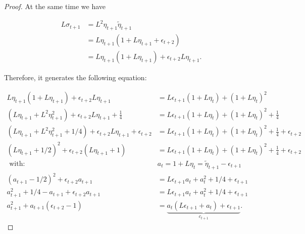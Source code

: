\documentclass[12pt]{article}
\begin{document}
\begin{proof}
            At the same time we have 

            \begin{align*}
                L \sigma_{t + 1} &= L^2 \eta_{t + 1}\tilde \eta_{t + 1} 
                \\
                &= L\eta_{t + 1}(1 + L \eta_{t + 1} + \epsilon_{t + 2})
                \\
                &= L\eta_{t + 1}(1 + L \eta_{t + 1}) + \epsilon_{t + 2}L\eta_{t + 1}. 
            \end{align*}

            Therefore, it generates the following equation: 

            \begin{align*}
                L\eta_{t + 1} (1 + L \eta_{t + 1}) 
                + 
                \epsilon_{t + 2} L \eta_{t + 1} 
                &= 
                L\epsilon_{t + 1}(1 + L \eta_t)  + (1 + L\eta_t)^2
                \\
                (L\eta_{t + 1} + L^2\eta_{t + 1}^2)
                + 
                \epsilon_{t + 2} L \eta_{t + 1} 
                + 
                \frac{1}{4}
                &= 
                L\epsilon_{t + 1}(1 + L \eta_t)  + (1 + L\eta_t)^2
                + 
                \frac{1}{4}
                \\
                (L\eta_{t + 1} + L^2\eta_{t + 1}^2 + 1/4)
                + 
                \epsilon_{t + 2} L \eta_{t + 1} 
                + \epsilon_{t + 2}
                &= 
                L\epsilon_{t + 1}(1 + L \eta_t)  + (1 + L\eta_t)^2
                + \frac{1}{4}
                + \epsilon_{t + 2}
                \\
                (L\eta_{t + 1} + 1/2)^2 + \epsilon_{t + 2}(L \eta_{t + 1} + 1)
                &= 
                L \epsilon_{t + 1}(1 + L \eta_t) + (1 + L\eta_t)^2
                + \frac{1}{4} + \epsilon_{t + 2}
                \\
                \text{ with: } & a_t = 1 + L \eta_t = \tilde \eta_{t + 1} - \epsilon_{t + 1}
                \\
                (a_{t + 1} - 1/2)^2 + \epsilon_{t + 2}a_{t + 1}
                &= 
                L \epsilon_{t + 1}a_t + a_t^2 + 1/4 + \epsilon_{t + 1}
                \\
                a_{t + 1}^2 + 1/4 - a_{t + 1} + \epsilon_{t + 2}a_{t + 1}
                &= 
                L \epsilon_{t + 1}a_t + a_t^2 + 1/4 + \epsilon_{t + 1}
                \\
                a_{t + 1}^2 + a_{t + 1}(\epsilon_{t + 2} - 1)
                &= 
                \underbrace{
                    a_t(L \epsilon_{t + 1} + a_t) + \epsilon_{t + 1}
                }_{c_{t + 1}}. 
            \end{align*}


\end{proof}
\end{document}
